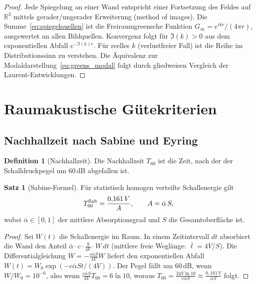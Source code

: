﻿\documentclass[12pt, a4paper]{article}
\theoremstyle{definition}
\newtheorem{definition}{Definition}[section]
\newtheorem{satz}{Satz}[section]
\theoremstyle{remark}
\newcommand{\R}{\mathbb{R}}
\begin{document}
\begin{proof}
Jede Spiegelung an einer Wand entspricht einer Fortsetzung des Feldes auf
$\R^3$ mittels gerader/ungerader Erweiterung (method of images).
Die Summe~\eqref{eq:spiegelquellen} ist die Freiraumgreensche Funktion
$G_\infty = e^{ikr}/(4\pi r)$, ausgewertet an allen Bildquellen.
Konvergenz folgt für $\Im(k) > 0$ aus dem exponentiellen Abfall $e^{-\Im(k)r}$.
Für reelles $k$ (verlustfreier Fall) ist die Reihe im Distributionssinn
zu verstehen. Die Äquivalenz zur Modaldarstellung~\eqref{eq:greens_modal}
folgt durch gliedweisen Vergleich der Laurent-Entwicklungen. 
\end{proof}

\section{Raumakustische Gütekriterien}
\label{sec:raumakustik}

\subsection{Nachhallzeit nach Sabine und Eyring}

\begin{definition}[Nachhallzeit]
Die Nachhallzeit $T_{60}$ ist die Zeit, nach der der Schalldruckpegel
um 60\,dB abgefallen ist.
\end{definition}

\begin{satz}[Sabine-Formel]
\label{satz:sabine}
Für statistisch homogen verteilte Schallenergie gilt
\begin{equation}
  T_{60}^{\rm Sab} = \frac{0{,}161\,V}{A},
  \qquad A = \bar{\alpha}\,S,
  \label{eq:sabine}
\end{equation}
wobei $\bar{\alpha} \in [0,1]$ der mittlere Absorptionsgrad
und $S$ die Gesamtoberfläche ist.
\end{satz}

\begin{proof}
Sei $W(t)$ die Schallenergie im Raum. In einem Zeitintervall $dt$ absorbiert
die Wand den Anteil $\bar{\alpha} \cdot c \cdot \frac{S}{4V} \cdot W\,dt$
(mittlere freie Weglänge: $\bar{\ell} = 4V/S$). Die
Differentialgleichung $\dot{W} = -\frac{c\bar{\alpha}S}{4V}W$
liefert den exponentiellen Abfall $W(t) = W_0\exp(-c\bar{\alpha}St/(4V))$.
Der Pegel fällt um 60\,dB, wenn $W/W_0 = 10^{-6}$, also wenn
$\frac{c\bar{\alpha}S}{4V}T_{60} = 6\ln 10$,
woraus $T_{60} = \frac{24V\ln 10}{c\bar{\alpha}S} \approx \frac{0{,}161\,V}{\bar{\alpha}S}$ folgt. 
\end{proof}
\end{document}
